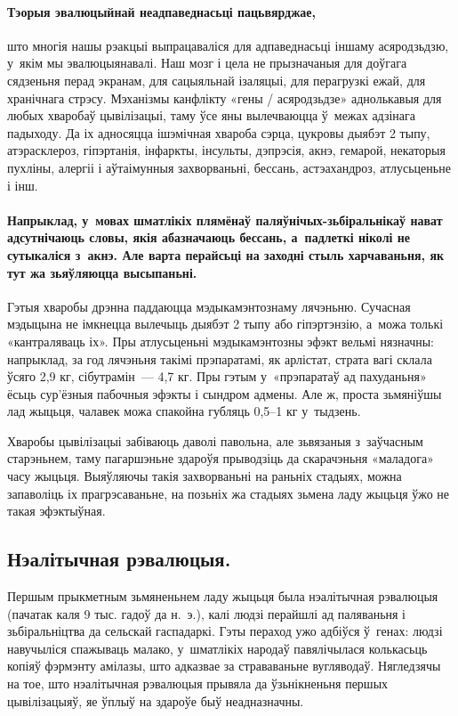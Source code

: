 \paragraph{Тэорыя эвалюцыйнай неадпаведнасьці пацьвярджае,} што многія нашы рэакцыі выпрацаваліся для адпаведнасьці іншаму асяродзьдзю, у~якім мы эвалюцыянавалі. Наш мозг і цела не прызначаныя для доўгага сядзеньня перад экранам, для сацыяльнай ізаляцыі, для перагрузкі ежай, для хранічнага стрэсу. Мэханізмы канфлікту «гены / асяродзьдзе» аднолькавыя для любых хваробаў цывілізацыі, таму ўсе яны вылечваюцца ў~межах адзінага падыходу. Да іх адносяцца ішэмічная хвароба сэрца, цукровы дыябэт 2 тыпу, атэрасклероз, гіпэртанія, інфаркты, інсульты, дэпрэсія, акнэ, гемарой, некаторыя пухліны, алергіі і аўтаімунныя захворваньні, бессань, астэахандроз, атлусьценьне і інш.


\paragraph{Напрыклад, у~мовах шматлікіх плямёнаў паляўнічых-зьбіральнікаў нават адсутнічаюць словы, якія абазначаюць бессань, а~падлеткі ніколі не сутыкаліся з~акнэ. Але варта перайсьці на заходні стыль харчаваньня, як тут жа зьяўляюцца высыпаньні.} Гэтыя хваробы дрэнна паддаюцца мэдыкамэнтознаму лячэньню. Сучасная мэдыцына не імкнецца вылечыць дыябэт 2 тыпу або гіпэртэнзію, а~можа толькі «кантраляваць іх». Пры атлусьценьні мэдыкамэнтозны эфэкт вельмі нязначны: напрыклад, за год лячэньня такімі прэпаратамі, як арлістат, страта вагі склала ўсяго 2,9 кг, сібутрамін~--- 4,7 кг. Пры гэтым у~«прэпаратаў ад пахуданьня» ёсьць сур'ёзныя пабочныя эфэкты і сындром адмены. Але ж, проста зьмяніўшы лад жыцьця, чалавек можа спакойна губляць 0,5--1 кг у~тыдзень.

Хваробы цывілізацыі забіваюць даволі павольна, але зьвязаныя з~заўчасным старэньнем, таму пагаршэньне здароўя прыводзіць да скарачэньня «маладога» часу жыцьця. Выяўляючы такія захворваньні на раньніх стадыях, можна запаволіць іх прагрэсаваньне, на позьніх жа стадыях зьмена ладу жыцьця ўжо не такая эфэктыўная.

\subsection*{Нэалітычная рэвалюцыя.}

Першым прыкметным зьмяненьнем ладу жыцьця была нэалітычная рэвалюцыя (пачатак каля 9 тыс. гадоў да н.~э.), калі людзі перайшлі ад паляваньня і зьбіральніцтва да сельскай гаспадаркі. Гэты пераход ужо адбіўся ў~генах: людзі навучыліся спажываць малако, у~шматлікіх народаў павялічылася колькасьць копіяў фэрмэнту амілазы, што адказвае за страваваньне вугляводаў. Нягледзячы на тое, што нэалітычная рэвалюцыя прывяла да ўзьнікненьня першых цывілізацыяў, яе ўплыў на здароўе быў неадназначны.

